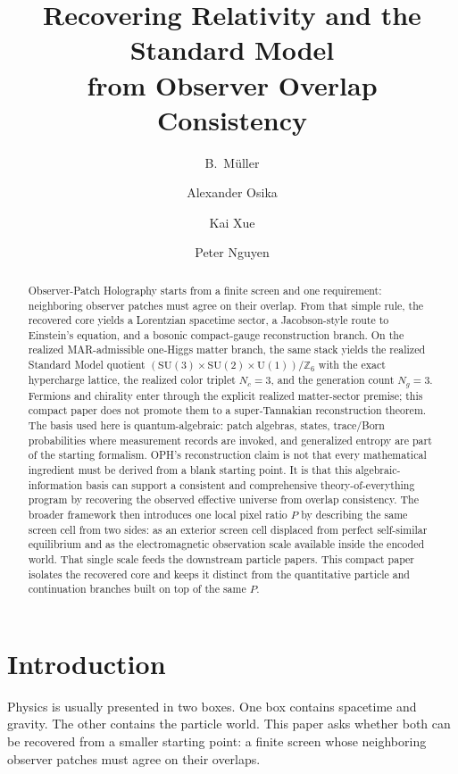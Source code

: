 \documentclass[11pt]{article}
\title{Recovering Relativity and the Standard Model\\
from Observer Overlap Consistency}
\author{B.\ M\"uller \and Alexander Osika \and Kai Xue \and Peter Nguyen}
\date{\OPHPaperReleaseDate}
\newcommand{\SU}{\mathrm{SU}}
\newcommand{\U}{\mathrm{U}}
\begin{document}
\maketitle
\OPHPaperReleaseBanner

\begin{abstract}
Observer-Patch Holography starts from a finite screen and one requirement: neighboring observer patches must agree on their overlap. From that simple rule, the recovered core yields a Lorentzian spacetime sector, a Jacobson-style route to Einstein's equation, and a bosonic compact-gauge reconstruction branch. On the realized MAR-admissible one-Higgs matter branch, the same stack yields the realized Standard Model quotient \(\left(\SU(3)\times\SU(2)\times\U(1)\right)/\mathbb Z_6\) with the exact hypercharge lattice, the realized color triplet \(N_c=3\), and the generation count \(N_g=3\). Fermions and chirality enter through the explicit realized matter-sector premise; this compact paper does not promote them to a super-Tannakian reconstruction theorem. The basis used here is quantum-algebraic: patch algebras, states, trace/Born probabilities where measurement records are invoked, and generalized entropy are part of the starting formalism. OPH's reconstruction claim is not that every mathematical ingredient must be derived from a blank starting point. It is that this algebraic-information basis can support a consistent and comprehensive theory-of-everything program by recovering the observed effective universe from overlap consistency. The broader framework then introduces one local pixel ratio \(P\) by describing the same screen cell from two sides: as an exterior screen cell displaced from perfect self-similar equilibrium and as the electromagnetic observation scale available inside the encoded world. That single scale feeds the downstream particle papers. This compact paper isolates the recovered core and keeps it distinct from the quantitative particle and continuation branches built on top of the same \(P\).
\end{abstract}

\section{Introduction}

Physics is usually presented in two boxes. One box contains spacetime and gravity. The other contains the particle world. This paper asks whether both can be recovered from a smaller starting point: a finite screen whose neighboring observer patches must agree on their overlaps.
\end{document}
